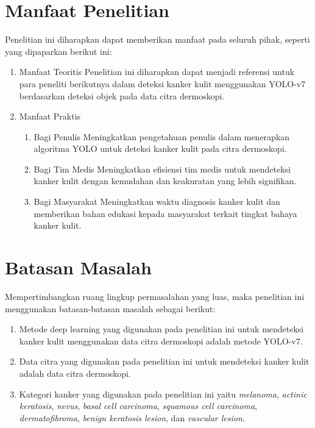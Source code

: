     \section{Manfaat Penelitian}
    Penelitian ini diharapkan dapat memberikan manfaat pada seluruh pihak, seperti yang dipaparkan berikut ini:
    \begin{enumerate}
        \item Manfaat Teoritis
        Penelitian ini diharapkan dapat menjadi referensi untuk para peneliti berikutnya dalam deteksi kanker kulit menggunakan YOLO-v7 berdasarkan deteksi objek pada data citra dermoskopi.

        \item Manfaat Praktis
        \begin{enumerate}
            \item Bagi Penulis
            Meningkatkan pengetahuan penulis dalam menerapkan algoritma YOLO untuk deteksi kanker kulit pada citra dermoskopi.

            \item Bagi Tim Medis
            Meningkatkan efisiensi tim medis untuk mendeteksi kanker kulit dengan kemudahan dan keakuratan yang lebih signifikan.

            \item Bagi Masyarakat
            Meningkatkan waktu diagnosis kanker kulit dan memberikan bahan edukasi kepada masyarakat terkait tingkat bahaya kanker kulit.
        \end{enumerate}
    \end{enumerate}

    \section{Batasan Masalah}
    Mempertimbangkan ruang lingkup permasalahan yang luas, maka penelitian ini menggunakan batasan-batasan masalah sebagai berikut:
    \begin{enumerate}
        \item Metode deep learning yang digunakan pada penelitian ini untuk mendeteksi kanker kulit menggunakan data citra dermoskopi adalah metode YOLO-v7.
        \item Data citra yang digunakan pada penelitian ini untuk mendeteksi kanker kulit adalah data citra dermoskopi.
        \item Kategori kanker yang digunakan pada penelitian ini yaitu \textit{melanoma}, \textit{actinic keratosis}, \textit{nevus}, \textit{basal cell carcinoma}, \textit{squamous cell carcinoma}, \textit{dermatofibroma}, \textit{benign keratosis lesion}, dan \textit{vascular lesion}.
    \end{enumerate}


